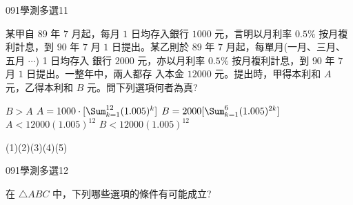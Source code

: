 \begin{QUESTIONS}
\begin{QUESTION}
    \end{QUESTION}
    \begin{QUESTION}
        \begin{ExamInfo}{091}{學測}{多選}{11}
        \end{ExamInfo}
        \begin{ExamAnsRateInfo}{16}{30}{12}{6}
        \end{ExamAnsRateInfo}
        \begin{QBODY}
            某甲自 $89$ 年 $7$ 月起，每月 $1$ 日均存入銀行 $1000$ 元，言明以月利率 $0.5\%$ 按月複利計息，到 $90$ 年 $7$ 月 $1$ 日提出。某乙則於 $89$ 年 $7$ 月起，每單月(一月、三月、五月 $\cdots$) 1 日均存入 銀行 $2000$ 元，亦以月利率 $0.5\%$ 按月複利計息，到 $90$ 年 $7$ 月 $1$ 日提出。一整年中，兩人都存 入本金 $12000$ 元。提出時，甲得本利和 $A$ 元，乙得本利和 $B$ 元。問下列選項何者為真? 
            \begin{QOPS} 
                \QOP $B>A$ 
                \QOP $A= 1000\cdot [\Sum_{k=1}^{12} (1.005)^k ]$ 
                \QOP $B= 2000 [\Sum_{k=1}^{6} (1.005)^{2k}] $ 
                \QOP $A< 12000 (1.005)^{12}$  
                \QOP $B< 12000 (1.005)^{12}$
            \end{QOPS}
        \end{QBODY}
        \begin{QFROMS}
        \end{QFROMS}
        \begin{QTAGS}\end{QTAGS}
        \begin{QANS}
            (1)(2)(3)(4)(5)
        \end{QANS}
        \begin{QSOLLIST}
        \end{QSOLLIST}
        \begin{QEMPTYSPACE}
        \end{QEMPTYSPACE}
    \end{QUESTION}
    \begin{QUESTION}
        \begin{ExamInfo}{091}{學測}{多選}{12}
        \end{ExamInfo}
        \begin{ExamAnsRateInfo}{36}{67}{29}{12}
        \end{ExamAnsRateInfo}
        \begin{QBODY}
            在 $\triangle ABC$ 中，下列哪些選項的條件有可能成立?
            \begin{QOPS} 

\end{QOPS}
\end{QBODY}
\end{QUESTION}
\end{QUESTIONS}
